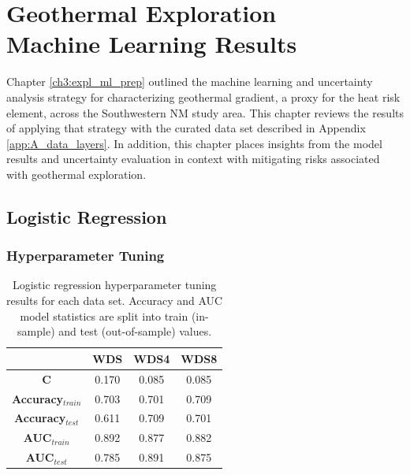 \chapter{Geothermal Exploration\\Machine Learning Results}\label{ch5:ml_results}

Chapter \ref{ch3:expl_ml_prep} outlined the machine learning and uncertainty analysis strategy for characterizing geothermal gradient, a proxy for the heat risk element, across the Southwestern NM study area. This chapter reviews the results of applying that strategy with the curated data set described in Appendix \ref{app:A_data_layers}. In addition, this chapter places insights from the model results and uncertainty evaluation in context with mitigating risks associated with geothermal exploration.

\section{Logistic Regression} \label{ch5:lr_model}
\subsection{Hyperparameter Tuning} \label{ch5:lr_tuning}
\begin{table}
\centering
\begin{tabular}{c|c|c|c|}
\cline{2-4}
                                 & \textbf{WDS}   & \textbf{WDS4}  & \textbf{WDS8}  \\ \hline
\multicolumn{1}{|c|}{\textbf{C}}          & 0.170 & 0.085 & 0.085 \\ \hline
\multicolumn{1}{|c|}{\textbf{Accuracy$_{train}$}} & 0.703 & 0.701 & 0.709 \\ \hline
\multicolumn{1}{|c|}{\textbf{Accuracy$_{test}$}}  & 0.611 & 0.709 & 0.701 \\ \hline
\multicolumn{1}{|c|}{\textbf{AUC$_{train}$}} & 0.892 & 0.877 & 0.882 \\ \hline
\multicolumn{1}{|c|}{\textbf{AUC$_{test}$}}  & 0.785 & 0.891 & 0.875 \\ \hline
\end{tabular}
\singlespacing
\caption[Logistic regression hyperparameter tuning results]{Logistic regression hyperparameter tuning results for each data set. Accuracy and AUC model statistics are split into train (in-sample) and test (out-of-sample) values.}
\label{tab:logreg_tuning}
\end{table}

